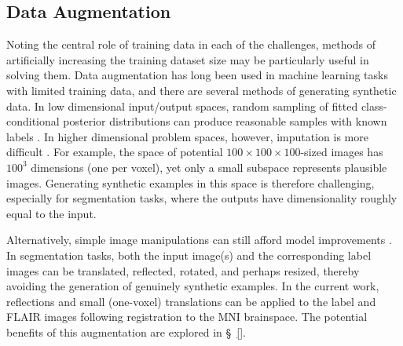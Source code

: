 \subsection{Data Augmentation}\label{ss:meth-aug}
Noting the central role of training data in each of the challenges, methods of artificially increasing the training dataset size may be particularly useful in solving them.
Data augmentation has long been used in machine learning tasks with limited training data, and there are several methods of generating synthetic data.
In low dimensional input/output spaces, random sampling of fitted class-conditional posterior distributions can produce reasonable samples with known labels \cite{Tanner1987}.
In higher dimensional problem spaces, however, imputation is more difficult \cite{Goodfellow2014}.
For example, the space of potential $100\times100\times100$-sized images has $100^3$ dimensions (one per voxel), yet only a small subspace represents plausible images.
Generating synthetic examples in this space is therefore challenging, especially for segmentation tasks, where the outputs have dimensionality roughly equal to the input.
\par
Alternatively, simple image manipulations can still afford model improvements \cite{Krizhevsky2012}.
In segmentation tasks, both the input image(s) and the corresponding label images can be translated, reflected, rotated, and perhaps resized, thereby avoiding the generation of genuinely synthetic examples.
In the current work, reflections and small (one-voxel) translations can be applied to the label and FLAIR images following registration to the MNI brainspace.
The potential benefits of this augmentation are explored in \S\ \ref{}.
